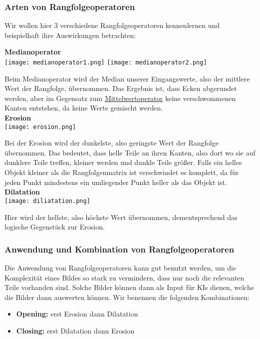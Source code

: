 \subsubsection{Arten von Rangfolgeoperatoren}
\label{sec:types-of-ranking-operators}

Wir wollen hier 3 verschiedene Rangfolgeoperatoren kennenlernen und beispielhaft ihre Auswirkungen betrachten:

\textbf{Medianoperator}\\

\texttt{[image: medianoperator1.png]}
\texttt{[image: medianoperator2.png]}

Beim Medianoperator wird der Median unserer Eingangswerte, also der mittlere Wert der Rangfolge, übernommen. Das Ergebnis ist, dass Ecken abgerundet werden, aber im Gegensatz zum \hyperref[sec:mean-operator]{Mittelwertoperator} keine verschwommenen Kanten entstehen, da keine Werte gemischt werden.\\


\textbf{Erosion}\\

\texttt{[image: erosion.png]}

Bei der Erosion wird der dunkelste, also geringste Wert der Rangfolge übernommen. Das bedeutet, dass helle Teile an ihren Kanten, also dort wo sie auf dunklere Teile treffen, kleiner werden und dunkle Teile größer. Falls ein helles Objekt kleiner als die Rangfolgenmatrix ist verschwindet es komplett, da für jeden Punkt mindestens ein umliegender Punkt heller als das Objekt ist.\\

\textbf{Dilatation}\\

\texttt{[image: diliatation.png]}

Hier wird der hellste, also höchste Wert übernommen, dementsprechend das logische Gegenstück zur Erosion.

\subsubsection{Anwendung und Kombination von Rangfolgeoperatoren}

Die Anwendung von Rangfolgeoperatoren kann gut benutzt werden, um die Komplexität eines Bildes so stark zu vermindern, dass nur noch die relevanten Teile vorhanden sind. Solche Bilder können dann als Input für KIs dienen, welche die Bilder dann auswerten können. Wir benennen die folgenden Kombinationen:
\begin{itemize}
    \item \textbf{Opening:} erst Erosion dann Dilatation
    \item \textbf{Closing:} erst Dilatation dann Erosion
\end{itemize}

